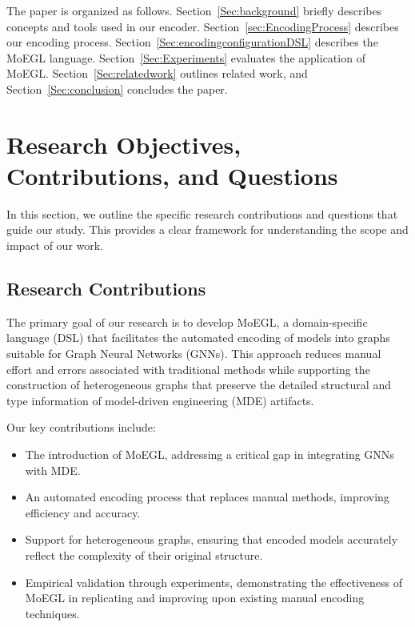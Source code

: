 \documentclass[journal,article,submit,moreauthors,technologies]{Definitions/mdpi}
\begin{document}
The paper is organized as follows. Section~\ref{Sec:background} briefly describes concepts and tools used in our encoder. Section~\ref{sec:EncodingProcess} describes our encoding process. Section~\ref{Sec:encodingconfigurationDSL} describes the MoEGL language. Section~\ref{Sec:Experiments} evaluates the application of MoEGL. Section~\ref{Sec:relatedwork} outlines related work, and Section~\ref{Sec:conclusion} concludes the paper.

\section{Research Objectives, Contributions, and Questions}
In this section, we outline the specific research contributions and questions that guide our study. This provides a clear framework for understanding the scope and impact of our work.

\subsection{Research Contributions}

The primary goal of our research is to develop MoEGL, a domain-specific language (DSL) that facilitates the automated encoding of models into graphs suitable for Graph Neural Networks (GNNs). This approach reduces manual effort and errors associated with traditional methods while supporting the construction of heterogeneous graphs that preserve the detailed structural and type information of model-driven engineering (MDE) artifacts.

Our key contributions include:

\begin{itemize}
    \item The introduction of MoEGL, addressing a critical gap in integrating GNNs with MDE.
    \item An automated encoding process that replaces manual methods, improving efficiency and accuracy.
    \item Support for heterogeneous graphs, ensuring that encoded models accurately reflect the complexity of their original structure.
    \item Empirical validation through experiments, demonstrating the effectiveness of MoEGL in replicating and improving upon existing manual encoding techniques.
\end{itemize}
\end{document}
